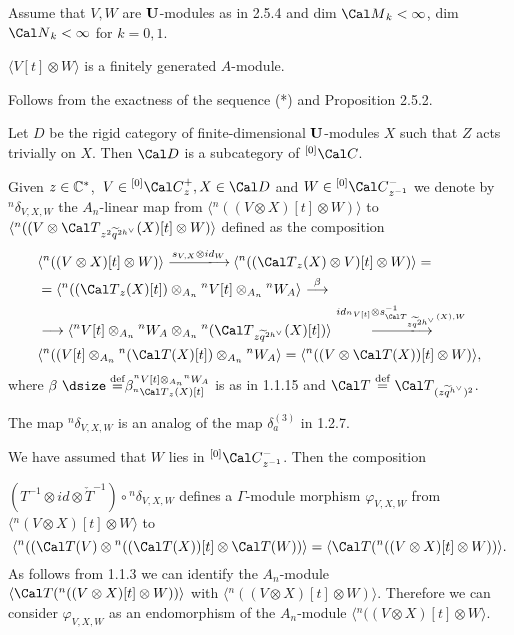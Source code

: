   Assume that $V,W$  are ${\bold U}$-modules as in 2.5.4 and
dim
${\Cal M}_k < \infty$, dim ${\Cal N}_k < \infty$  for $k = 0,1$.

  $\langle V[t] \otimes W\rangle$  is a finitely generated
$A$-module.
\endproclaim

 Follows from the exactness of the sequence (*) and
Proposition 2.5.2.
\enddemo

  Let  $D$  be the rigid category of finite-dimensional
${\bold U}$-modules $X$ such that $Z$ acts trivially on $X$.  Then ${\Cal D}$
is a
subcategory of  ${}^{[0]}{\Cal C}$.

Given $z \in {\Bbb C}^*$,\ $V \in {}^{[0]}{\Cal C}^+_z, X \in {\Cal D}$  and
$W \in
{}^{[0]}{\Cal C}^-_{z^{-1}}$  we denote by\  ${}^n\delta_{V,X,W}$  the
$A_n$-linear map from  $\langle {}^n((V \otimes X)[t] \otimes W)\rangle$ to
$\langle {}^n((V \otimes {\Cal T}_{z^2\widetilde{q}^{2h^\vee}}(X)[t]
\otimes W)\rangle$  defined as the composition
$$
\aligned
&\langle {}^n((V \otimes X)[t] \otimes W)\rangle\
{\buildrel{s_{V,X} \otimes id_W}\over\llongrightarrow}\
\langle {}^n(({\Cal T}_z (X) \otimes V)[t] \otimes W)\rangle = \\
& = \langle {}^n(({\Cal T}_z (X)[t]) \otimes_{A_n}
{}^nV[t] \otimes_{A_n} {}^nW_A\rangle\
{\buildrel {\beta}\over\longrightarrow} \\
& \longrightarrow \langle {}^n V[t] \otimes_{A_n} {}^nW_A  \otimes_{A_n}
{}^n({\Cal T}_{z\widetilde{q}^{2h^\vee}} (X) [t])\rangle\
{\buildrel {id_{{}^nV[t]} \otimes
s^{-1}_{{\Cal T}_{z\widetilde{q}^{2h^\vee}}(X),W}}\over\llongrightarrow}\\
& \langle {}^n((V[t] \otimes_{A_n}
{}^n({\Cal T}(X)[t]) \otimes_{A_n}
{}^n W_A\rangle =
\langle {}^n((V \otimes {\Cal T}(X))[t]
\otimes W)\rangle ,
\endaligned
$$
where  $\beta\ {\dsize\buildrel{\text{def}}\over =}
\beta^{{}^nV[t] \otimes_{A_n} {}^nW_A}_{{}^n{\Cal T}_z(X)[t]}$  is as
in 1.1.15  and  ${\Cal T}\ {\buildrel{\text{def}}\over =}\
{\Cal T}_{(z\widetilde{q}^{h^\vee})^2}$.

\demo{Remark}  The map  ${}^n\delta_{V,X,W}$  is an analog of the map
$\delta_a^{(3)}$  in 1.2.7.
\enddemo

  We have assumed that $W$ lies in  ${}^{[0]}{\Cal
C}^-_{z^{-1}}$.
Then the composition

\noindent
$(T^{-1} \otimes id \otimes \check{T}^{-1}) \circ
{}^n\delta_{V,X,W}$  defines a $\Gamma$-module morphism $\varphi_{V,X,W}$ from
$\langle {}^n(V \otimes X)[t] \otimes W\rangle$ to
$$
\langle {}^n(({\Cal T}(V)  \otimes
{}^n(({\Cal T}(X))[t] \otimes
{\Cal T}(W))\rangle  =
\langle {\Cal T}({}^n((V \otimes X)[t] \otimes W))\rangle.
$$
As follows from 1.1.3 we can identify the $A_n$-module
$\langle {\Cal T}({}^n((V \otimes X)[t] \otimes W))\rangle$
with $\langle {}^n((V \otimes X)[t] \otimes W)\rangle$.  Therefore we can
consider $\varphi_{V,X,W}$  as an endomorphism of the $A_n$-module
$\langle {}^n((V \otimes X)[t] \otimes W\rangle$.

